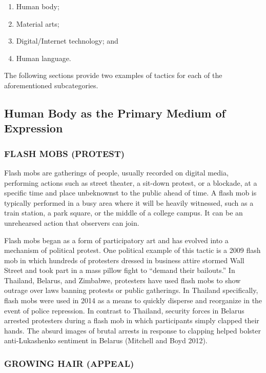 \documentclass[twoside,a4paper,12pt,fleqn,openany]{extbook}
\begin{document}
\begin{enumerate}
\item Human body;
\item Material arts;
\item Digital/Internet technology; and
\item Human language.
\end{enumerate}

The following sections provide two examples of tactics for each of the aforementioned subcategories.

\subsection*{Human Body as the Primary Medium of Expression}

\subsubsection*{FLASH MOBS (PROTEST)}

Flash mobs are gatherings of people, usually recorded on digital media, performing actions such as street theater, a sit-down protest, or a blockade, at a specific time and place unbeknownst to the public ahead of time. A flash mob is typically performed in a busy area where it will be heavily witnessed, such as a train station, a park square, or the middle of a college campus. It can be an unrehearsed action that observers can join.

Flash mobs began as a form of participatory art and has evolved into a mechanism of political protest. One political example of this tactic is a 2009 flash mob in which hundreds of protesters dressed in business attire stormed Wall Street and took part in a mass pillow fight to “demand their bailouts.” In Thailand, Belarus, and Zimbabwe, protesters have used flash mobs to show outrage over laws banning protests or public gatherings. In Thailand specifically, flash mobs were used in 2014 as a means to quickly disperse and reorganize in the event of police repression. In contrast to Thailand, security forces in Belarus arrested protesters during a flash mob in which participants simply clapped their hands. The absurd images of brutal arrests in response to clapping helped bolster anti-Lukashenko sentiment in Belarus (Mitchell and Boyd 2012).

\subsubsection*{GROWING HAIR (APPEAL)}
\end{document}
